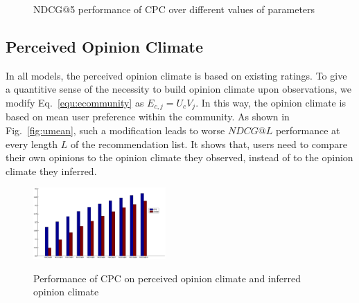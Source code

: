 \documentclass[sigconf]{acmart}
\begin{document}
\begin{figure}[htbp]
\centering
{}
\caption{NDCG@5 performance of CPC over different values of parameters}\label{fig:parameter}
\end{figure}

\subsection{Perceived Opinion Climate}

In all models, the perceived opinion climate is based on existing ratings. To give a quantitive sense of the necessity to build opinion climate upon observations, we modify Eq.~\ref{equ:ecommunity} as $E_{c,j}=U_cV_j$. In this way, the opinion climate is based on mean user preference within the community.  As shown in Fig.~\ref{fig:umean}, such a modification leads to worse $NDCG@L$ performance at every length $L$ of the recommendation list. It shows that, users need to compare their own opinions to the opinion climate they observed, instead of to the opinion climate they inferred.

\begin{figure}[htbp]
\begin{center}
\includegraphics[width=0.45\textwidth]{fig15_umean.eps}
\caption{Performance of CPC on perceived opinion climate and inferred opinion climate}\label{fig:umean}
\label{default}
\end{center}
\end{figure}
\end{document}
